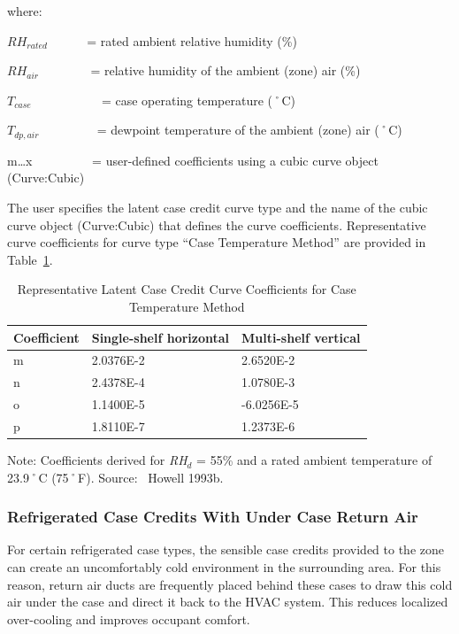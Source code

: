 where:

\(R{H_{rated}}\) ~~~~~ = rated ambient relative humidity (\%)

\(R{H_{air}}\) ~~~~~~~ = relative humidity of the ambient (zone) air (\%)

\({T_{case}}\) ~~~~~~~~~~ = case operating temperature (˚C)

\({T_{dp,air}}\) ~~~~~~~~ = dewpoint temperature of the ambient (zone) air (˚C)

m\ldots{}x~~~~~~~~~ = user-defined coefficients using a cubic curve object (Curve:Cubic)

The user specifies the latent case credit curve type and the name of the cubic curve object (Curve:Cubic) that defines the curve coefficients. Representative curve coefficients for curve type ``Case Temperature Method'' are provided in Table~\ref{table:representative-latent-case-credit-curve}.

\begin{longtable}[c]{@{}lll@{}}
\caption{Representative Latent Case Credit Curve Coefficients for Case Temperature Method \protect \label{table:representative-latent-case-credit-curve}}\\
\toprule 
Coefficient & Single-shelf horizontal & Multi-shelf vertical \tabularnewline \midrule
\endhead
m & 2.0376E-2 & 2.6520E-2 \tabularnewline
n & 2.4378E-4 & 1.0780E-3 \tabularnewline
o & 1.1400E-5 & -6.0256E-5 \tabularnewline
p & 1.8110E-7 & 1.2373E-6 \tabularnewline
\bottomrule
\end{longtable}

Note: Coefficients derived for \emph{RH\(_{d}\)} = 55\% and a rated ambient temperature of 23.9˚C (75˚F). Source:~ Howell 1993b.

\subsubsection{Refrigerated Case Credits With Under Case Return Air}\label{refrigerated-case-credits-with-under-case-return-air}

For certain refrigerated case types, the sensible case credits provided to the zone can create an uncomfortably cold environment in the surrounding area. For this reason, return air ducts are frequently placed behind these cases to draw this cold air under the case and direct it back to the HVAC system. This reduces localized over-cooling and improves occupant comfort.


